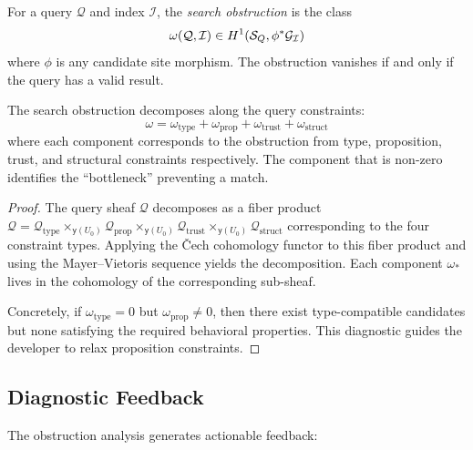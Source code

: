 \documentclass[11pt]{article}
\newcommand{\SemIndex}{\mathcal{I}}
\newcommand{\QuerySheaf}{\mathcal{Q}}
\newcommand{\yo}{\mathsf{y}}                         %
\newcommand{\ObstructionClass}{\omega}               %
\begin{document}
\begin{definition}\label{def:search-obstruction}
For a query $\QuerySheaf$ and index $\SemIndex$, the \emph{search
obstruction} is the class
\[
  \ObstructionClass(\QuerySheaf, \SemIndex) \in
  \Hcoh{1}(\Site_Q, \phi^{*}\mathcal{G}_{\SemIndex})
\]
where $\phi$ is any candidate site morphism.  The obstruction vanishes
if and only if the query has a valid result.
\end{definition}

\begin{proposition}\label{prop:obstruction-decomp}
The search obstruction decomposes along the query constraints:
\[
  \ObstructionClass = \ObstructionClass_{\mathrm{type}} +
  \ObstructionClass_{\mathrm{prop}} +
  \ObstructionClass_{\mathrm{trust}} +
  \ObstructionClass_{\mathrm{struct}}
\]
where each component corresponds to the obstruction from type, proposition,
trust, and structural constraints respectively.  The component that is
non-zero identifies the ``bottleneck'' preventing a match.
\end{proposition}

\begin{proof}
The query sheaf $\QuerySheaf$ decomposes as a fiber product
$\QuerySheaf = \QuerySheaf_{\mathrm{type}} \times_{\yo(U_0)}
\QuerySheaf_{\mathrm{prop}} \times_{\yo(U_0)}
\QuerySheaf_{\mathrm{trust}} \times_{\yo(U_0)}
\QuerySheaf_{\mathrm{struct}}$
corresponding to the four constraint types.  Applying the \v{C}ech
cohomology functor to this fiber product and using the Mayer--Vietoris
sequence yields the decomposition.  Each component
$\ObstructionClass_{*}$ lives in the cohomology of the corresponding
sub-sheaf.

Concretely, if $\ObstructionClass_{\mathrm{type}} = 0$ but
$\ObstructionClass_{\mathrm{prop}} \neq 0$, then there exist
type-compatible candidates but none satisfying the required behavioral
properties.  This diagnostic guides the developer to relax proposition
constraints.
\end{proof}

\subsection{Diagnostic Feedback}

The obstruction analysis generates actionable feedback:
\end{document}
